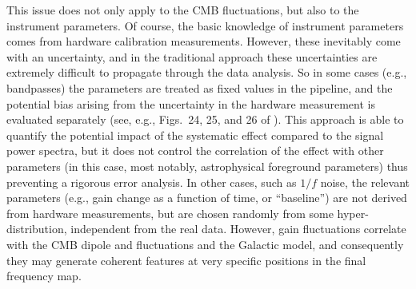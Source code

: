 \documentclass[twocolumn]{aa}
\begin{document}
This issue does not only apply to the CMB fluctuations, but also to
the instrument parameters. Of course, the basic knowledge of
instrument parameters comes from hardware calibration
measurements. However, these inevitably come with an uncertainty, and
in the traditional approach these uncertainties are extremely
difficult to propagate through the data analysis. So in some cases
(e.g., bandpasses) the parameters are treated as fixed values in the
pipeline, and the potential bias arising from the uncertainty in the
hardware measurement is evaluated separately (see, e.g., Figs.~24, 25,
and 26 of \citealp{planck2014-a14}).  This approach is able to
quantify the potential impact of the systematic effect compared to the
signal power spectra, but it does not control the correlation of the
effect with other parameters (in this case, most notably,
astrophysical foreground parameters) thus preventing a rigorous error
analysis. In other cases, such as $1/f$ noise, the relevant parameters
(e.g., gain change as a function of time, or ``baseline'') are not
derived from hardware measurements, but are chosen randomly from some
hyper-distribution, independent from the real data. However, gain
fluctuations correlate with the CMB dipole and fluctuations and the
Galactic model, and consequently they may generate coherent features
at very specific positions in the final frequency map.
\end{document}
